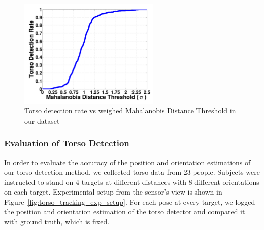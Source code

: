 \begin{figure}[ht!]
\centering
\includegraphics[width=0.6\textwidth]{pics/torso_detection_rate}
\caption{Torso detection rate vs weighed Mahalanobis Distance Threshold in our dataset}
\label{fig:torso_detection_rate}
\end{figure}

\subsubsection{Evaluation of Torso Detection}

In order to evaluate the accuracy of the position and orientation estimations of our torso detection method, we collected torso data from 23 people. Subjects were instructed to stand on 4 targets at different distances with 8 different orientations on each target. Experimental setup from the sensor's view is shown in Figure~\ref{fig:torso_tracking_exp_setup}. For each pose at every target, we logged the position and orientation estimation of the torso detector and compared it with ground truth, which is fixed.

